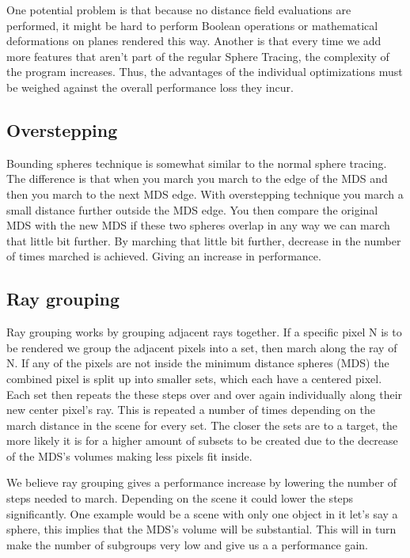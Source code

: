 			One potential problem is that because no distance field evaluations 
			are performed, it might be hard to perform Boolean operations or 
			mathematical deformations on planes rendered this way. Another is 
			that every time we add more features that aren't part of the 
			regular Sphere Tracing, the complexity of the program increases. 
			Thus, the advantages of the individual optimizations must be 
			weighed against the overall performance loss they incur. 

		\subsection{Overstepping}

			Bounding spheres technique is somewhat similar to the normal sphere
			tracing. The difference is that when you march you march to the
			edge of the MDS and then you march to the next MDS edge. With
			overstepping technique you march a small distance further outside
			the MDS edge. You then compare the original MDS with the new MDS if
			these two spheres overlap in any way we can march that little bit
			further. By marching that little bit further, decrease in the
			number of times marched is achieved. Giving an increase in
			performance. 

		\subsection{Ray grouping}
		
			Ray grouping works by grouping adjacent rays together. If a
			specific pixel N is to be rendered we group the adjacent pixels
			into a set, then march along the ray of N. If any of the pixels are
			not inside the minimum distance spheres (MDS) the combined pixel is
			split up into smaller sets, which each have a centered pixel. Each
			set then repeats the these steps over and over again individually
			along their new center pixel's ray. This is repeated a number of
			times depending on the march distance in the scene for every set.
			The closer the sets are to a target, the more likely it is for a
			higher amount of subsets to be created due to the decrease of the
			MDS's volumes making less pixels fit inside.
			
			We believe ray grouping gives a performance increase by lowering
			the number of steps needed to march. Depending on the scene it
			could lower the steps significantly. One example would be a scene
			with only one object in it let's say a sphere, this implies that
			the MDS's volume will be substantial. This will in turn make the
			number of subgroups very low and give us a a performance gain. 
			
